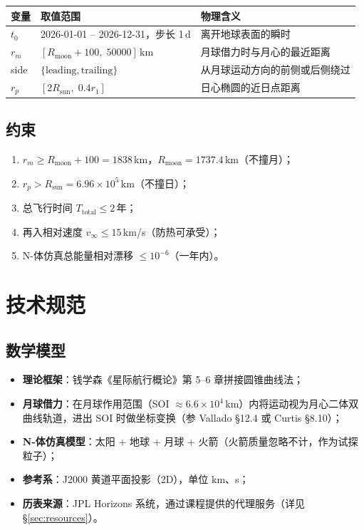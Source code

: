 \documentclass[11pt,a4paper]{ctexart}
\begin{document}
\begin{tabular}{@{}lll@{}}
\toprule
变量 & 取值范围 & 物理含义 \\
\midrule
$t_0$  & 2026-01-01 -- 2026-12-31，步长 1\,d & 离开地球表面的瞬时 \\
$r_m$  & $[R_{\text{moon}}+100,\;50000]$\,km & 月球借力时与月心的最近距离 \\
side   & $\{\text{leading},\text{trailing}\}$ & 从月球运动方向的前侧或后侧绕过 \\
$r_p$  & $[2R_{\text{sun}},\;0.4r_1]$ & 日心椭圆的近日点距离 \\
\bottomrule
\end{tabular}

\subsection{约束}

\begin{enumerate}[label=\textbf{C\arabic*.},leftmargin=*]
    \item $r_m \ge R_{\text{moon}} + 100 = 1838$\,km，$R_{\text{moon}} = 1737.4$\,km（不撞月）；
    \item $r_p > R_{\text{sun}} = 6.96 \times 10^5$\,km（不撞日）；
    \item 总飞行时间 $T_{\text{total}} \le 2$\,年；
    \item 再入相对速度 $v_\infty \le 15$\,km/s（防热可承受）；
    \item N-体仿真总能量相对漂移 $\le 10^{-6}$（一年内）。
\end{enumerate}

\section{技术规范}

\subsection{数学模型}

\begin{itemize}[leftmargin=*]
    \item \textbf{理论框架}：钱学森《星际航行概论》第 5--6 章拼接圆锥曲线法；
    \item \textbf{月球借力}：在月球作用范围（SOI $\approx 6.6\times 10^4$\,km）内将运动视为月心二体双曲线轨道，进出 SOI 时做坐标变换（参 Vallado §12.4 或 Curtis §8.10）；
    \item \textbf{N-体仿真模型}：太阳 + 地球 + 月球 + 火箭（火箭质量忽略不计，作为试探粒子）；
    \item \textbf{参考系}：J2000 黄道平面投影（2D），单位 km、s；
    \item \textbf{历表来源}：JPL Horizons 系统，通过课程提供的代理服务（详见 §\ref{sec:resources}）。
\end{itemize}
\end{document}
